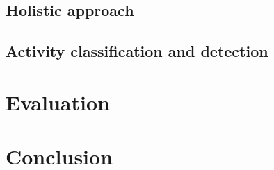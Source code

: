 \documentclass[10pt,twocolumn,letterpaper]{article}
\begin{document}
\subsection{Holistic approach}
\label{sec:cvpr12:approach:holistic}



% 

\subsection{Activity classification and detection}



\section{Evaluation}
 

 
\section{Conclusion}

 

{\scriptsize


}
\end{document}
